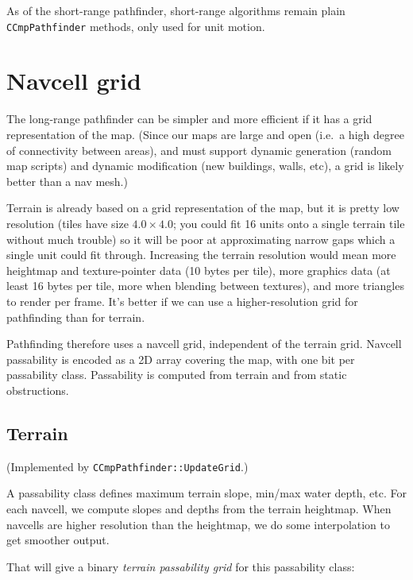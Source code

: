 \documentclass[a4paper,10pt]{article}
\begin{document}
As of the short-range pathfinder, short-range algorithms remain plain \texttt{CCmpPathfinder} methods, only used for unit motion.

\section{Navcell grid}

The long-range pathfinder can be simpler and more efficient if it has a
grid representation of the map.
(Since our maps are large and open (i.e.\ a high degree of connectivity
between areas), and must support dynamic generation (random map scripts)
and dynamic modification (new buildings, walls, etc),
a grid is likely better than a nav mesh.)

Terrain is already based on a grid representation of the map,
but it is pretty low resolution (tiles have size $4.0 \times 4.0$;
you could fit 16 units onto a single terrain tile without much trouble)
so it will be poor at approximating narrow gaps which a single unit could fit through.
Increasing the terrain resolution would mean more heightmap and texture-pointer data
(10 bytes per tile),
more graphics data
(at least 16 bytes per tile, more when blending between textures),
and more triangles to render per frame.
It's better if we can use a higher-resolution grid for pathfinding than for terrain.

Pathfinding therefore uses a navcell grid, independent of the terrain grid.
Navcell passability is encoded as a 2D array covering the map,
with one bit per passability class.
Passability is computed from terrain and from static obstructions.

\subsection{Terrain}

(Implemented by \texttt{CCmpPathfinder::UpdateGrid}.)

A passability class defines maximum terrain slope, min/max water depth, etc.
For each navcell, we compute slopes and depths from the terrain heightmap.
When navcells are higher resolution than the heightmap, we do some interpolation
to get smoother output.

That will give a binary \emph{terrain passability grid} for this passability class:

\end{document}
